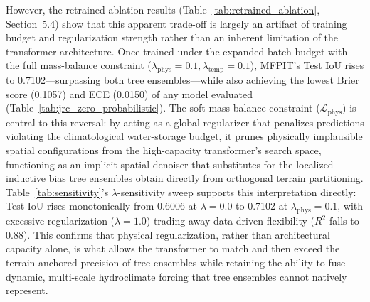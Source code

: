 \documentclass[preprint,12pt]{elsarticle}
\begin{document}
However, the retrained ablation results (Table~\ref{tab:retrained_ablation}, Section~5.4) show that this apparent trade-off is largely an artifact of training budget and regularization strength rather than an inherent limitation of the transformer architecture. Once trained under the expanded batch budget with the full mass-balance constraint ($\lambda_{\text{phys}} = 0.1, \lambda_{\text{temp}} = 0.1$), MFPIT's Test IoU rises to 0.7102---surpassing both tree ensembles---while also achieving the lowest Brier score (0.1057) and ECE (0.0150) of any model evaluated (Table~\ref{tab:jrc_zero_probabilistic}). The soft mass-balance constraint ($\mathcal{L}_{\text{phys}}$) is central to this reversal: by acting as a global regularizer that penalizes predictions violating the climatological water-storage budget, it prunes physically implausible spatial configurations from the high-capacity transformer's search space, functioning as an implicit spatial denoiser that substitutes for the localized inductive bias tree ensembles obtain directly from orthogonal terrain partitioning. Table~\ref{tab:sensitivity}'s $\lambda$-sensitivity sweep supports this interpretation directly: Test IoU rises monotonically from 0.6006 at $\lambda = 0.0$ to 0.7102 at $\lambda_{\text{phys}} = 0.1$, with excessive regularization ($\lambda = 1.0$) trading away data-driven flexibility ($R^2$ falls to 0.88). This confirms that physical regularization, rather than architectural capacity alone, is what allows the transformer to match and then exceed the terrain-anchored precision of tree ensembles while retaining the ability to fuse dynamic, multi-scale hydroclimate forcing that tree ensembles cannot natively represent.
\end{document}
